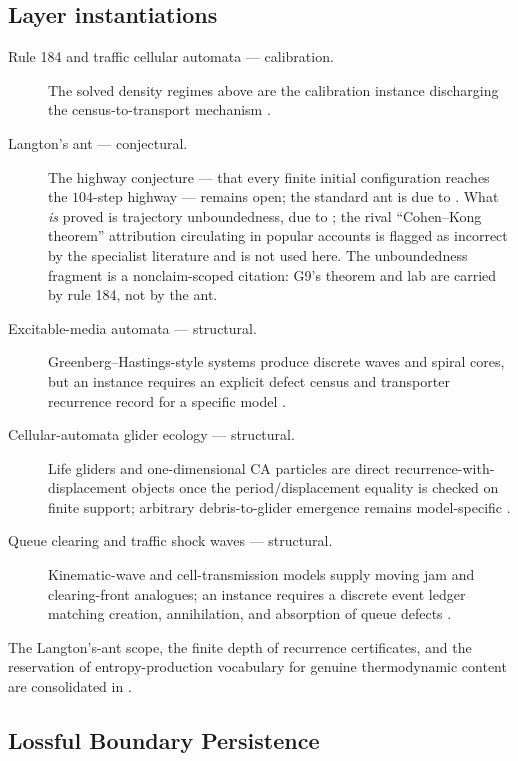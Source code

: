 \documentclass[11pt]{article}
\newcommand{\lawGTen}{Lossful Boundary Persistence}
\theoremstyle{definition}
\begin{document}
\subsection*{Layer instantiations}\label{layer-inst:G9}
\begin{description}
  \item[Rule 184 and traffic cellular automata --- calibration.] The solved density regimes above are
    the calibration instance discharging the census-to-transport mechanism
    \citep{Fuks1997,Nagel1996,ChowdhurySantenSchadschneider2000}.
  \item[Langton's ant --- conjectural.] The highway conjecture --- that every finite initial
    configuration reaches the $104$-step highway --- remains open; the standard ant is due to
    \citet{Langton1986}. What \emph{is} proved is trajectory unboundedness, due to
    \citet{BunimovichTroubetzkoy1992}; the rival ``Cohen--Kong theorem'' attribution circulating in
    popular accounts is flagged as incorrect by the specialist literature and is not used here. The
    unboundedness fragment is a nonclaim-scoped citation: G9's theorem and lab are carried by rule
    184, not by the ant.
  \item[Excitable-media automata --- structural.] Greenberg--Hastings-style systems produce discrete
    waves and spiral cores, but an instance requires an explicit defect census and transporter
    recurrence record for a specific model \citep{Greenberg1978,DurrettGriffeath}.
  \item[Cellular-automata glider ecology --- structural.] Life gliders and one-dimensional CA
    particles are direct recurrence-with-displacement objects once the period/displacement equality is
    checked on finite support; arbitrary debris-to-glider emergence remains model-specific
    \citep{Gardner1970,Pivato}.
  \item[Queue clearing and traffic shock waves --- structural.] Kinematic-wave and cell-transmission
    models supply moving jam and clearing-front analogues; an instance requires a discrete event
    ledger matching creation, annihilation, and absorption of queue defects
    \citep{LighthillWhitham1955,Richards1956,Daganzo1994}.
\end{description}

The Langton's-ant scope, the finite depth of recurrence certificates, and the reservation of
entropy-production vocabulary for genuine thermodynamic content are consolidated in
.

\subsection{\lawGTen}\label{sec:clusterC:g10}
\end{document}

